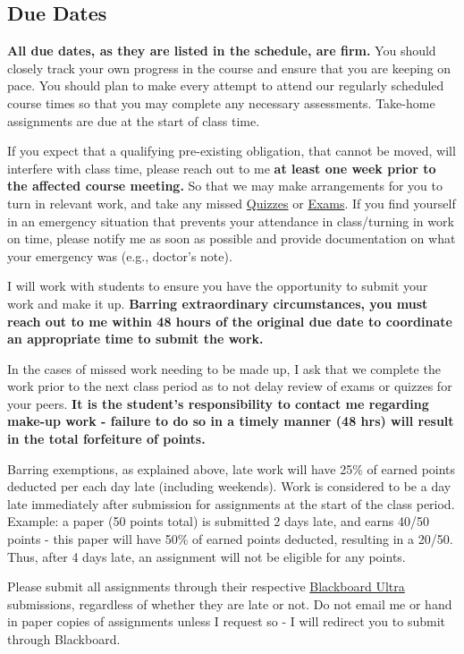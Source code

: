 \documentclass[
  12pt,
  letterpaper,
]{scrartcl}
\begin{document}
\subsection{Due Dates}\label{due-dates}

\textbf{All due dates, as they are listed in the schedule, are firm.}
You should closely track your own progress in the course and ensure that
you are keeping on pace. You should plan to make every attempt to attend
our regularly scheduled course times so that you may complete any
necessary assessments. Take-home assignments are due at the start of
class time.

If you expect that a qualifying pre-existing obligation, that cannot be
moved, will interfere with class time, please reach out to me \textbf{at
least one week prior to the affected course meeting.} So that we may
make arrangements for you to turn in relevant work, and take any missed
\hyperref[quizzes]{Quizzes} or \hyperref[exams]{Exams}. If you find
yourself in an emergency situation that prevents your attendance in
class/turning in work on time, please notify me as soon as possible and
provide documentation on what your emergency was (e.g., doctor's note).

I will work with students to ensure you have the opportunity to submit
your work and make it up. \textbf{Barring extraordinary circumstances,
you must reach out to me within 48 hours of the original due date to
coordinate an appropriate time to submit the work.}

In the cases of missed work needing to be made up, I ask that we
complete the work prior to the next class period as to not delay review
of exams or quizzes for your peers. \textbf{It is the student's
responsibility to contact me regarding make-up work - failure to do so
in a timely manner (48 hrs) will result in the total forfeiture of
points.}

Barring exemptions, as explained above, late work will have 25\% of
earned points deducted per each day late (including weekends). Work is
considered to be a day late immediately after submission for assignments
at the start of the class period. Example: a paper (50 points total) is
submitted 2 days late, and earns 40/50 points - this paper will have
50\% of earned points deducted, resulting in a 20/50. Thus, after 4 days
late, an assignment will not be eligible for any points.

Please submit all assignments through their respective
\hyperref[blackboard-ultra]{Blackboard Ultra} submissions, regardless of
whether they are late or not. Do not email me or hand in paper copies of
assignments unless I request so - I will redirect you to submit through
Blackboard.
\end{document}
